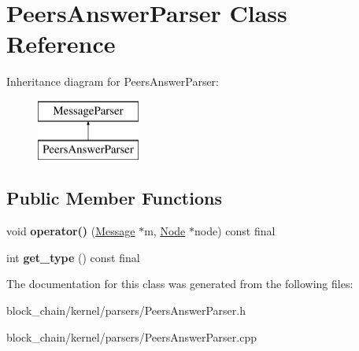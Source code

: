\hypertarget{classPeersAnswerParser}{}\section{Peers\+Answer\+Parser Class Reference}
\label{classPeersAnswerParser}
Inheritance diagram for Peers\+Answer\+Parser\+:\begin{figure}[H]
\begin{center}
\leavevmode
\includegraphics[height=2.000000cm]{classPeersAnswerParser}
\end{center}
\end{figure}
\subsection*{Public Member Functions}
\begin{DoxyCompactItemize}
\item 
\mbox{\label{classPeersAnswerParser_ad566095c0594805919e7e4d14f8b076e}} 
void {\bfseries operator()} (\mbox{\hyperlink{classMessage}{Message}} $\ast$m, \mbox{\hyperlink{classNode}{Node}} $\ast$node) const final
\item 
\mbox{\label{classPeersAnswerParser_a5f88ed07616ae3d17726f27b263645a6}} 
int {\bfseries get\+\_\+type} () const final
\end{DoxyCompactItemize}


The documentation for this class was generated from the following files\+:\begin{DoxyCompactItemize}
\item 
block\+\_\+chain/kernel/parsers/Peers\+Answer\+Parser.\+h\item 
block\+\_\+chain/kernel/parsers/Peers\+Answer\+Parser.\+cpp\end{DoxyCompactItemize}
